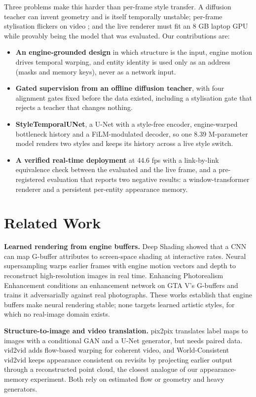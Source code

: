 \documentclass[conference]{IEEEtran}
\begin{document}
Three problems make this harder than per-frame style transfer. A diffusion teacher can invent geometry and is itself temporally unstable; per-frame stylisation flickers on video \cite{lai}; and the live renderer must fit an 8 GB laptop GPU while provably being the model that was evaluated. Our contributions are:
\begin{itemize}
\item \textbf{An engine-grounded design} in which structure is the input, engine motion drives temporal warping, and entity identity is used only as an address (masks and memory keys), never as a network input.
\item \textbf{Gated supervision from an offline diffusion teacher}, with four alignment gates fixed before the data existed, including a stylisation gate that rejects a teacher that changes nothing.
\item \textbf{StyleTemporalUNet}, a U-Net with a style-free encoder, engine-warped bottleneck history and a FiLM-modulated decoder, so one 8.39 M-parameter model renders two styles and keeps its history across a live style switch.
\item \textbf{A verified real-time deployment} at 44.6 fps with a link-by-link equivalence check between the evaluated and the live frame, and a pre-registered evaluation that reports two negative results: a window-transformer renderer and a persistent per-entity appearance memory.
\end{itemize}

\section{Related Work}\label{sec:related}

\textbf{Learned rendering from engine buffers.} Deep Shading \cite{deepshading} showed that a CNN can map G-buffer attributes to screen-space shading at interactive rates. Neural supersampling \cite{xiao} warps earlier frames with engine motion vectors and depth to reconstruct high-resolution images in real time. Enhancing Photorealism Enhancement \cite{epe} conditions an enhancement network on GTA V's G-buffers and trains it adversarially against real photographs. These works establish that engine buffers make neural rendering stable; none targets learned artistic styles, for which no real-image domain exists.

\textbf{Structure-to-image and video translation.} pix2pix \cite{pix2pix} translates label maps to images with a conditional GAN and a U-Net generator, but needs paired data. vid2vid \cite{vid2vid} adds flow-based warping for coherent video, and World-Consistent vid2vid \cite{wcvid2vid} keeps appearance consistent on revisits by projecting earlier output through a reconstructed point cloud, the closest analogue of our appearance-memory experiment. Both rely on estimated flow or geometry and heavy generators.
\end{document}
